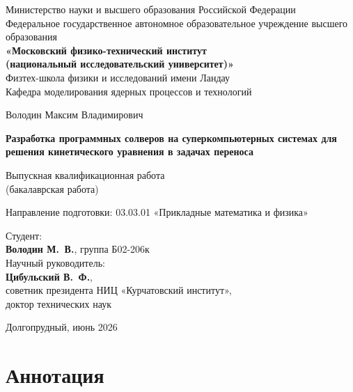\documentclass[14pt,a4paper]{extreport}
\numberwithin{equation}{chapter}
\numberwithin{figure}{chapter}
\numberwithin{table}{chapter}
\begin{document}
\begin{titlepage}
\thispagestyle{empty}
\centering
{\normalsize
Министерство науки и высшего образования Российской Федерации \\[2pt]
Федеральное государственное автономное образовательное учреждение высшего образования \\[2pt]
\textbf{«Московский физико-технический институт \\(национальный исследовательский университет)»} \\[6pt]
Физтех-школа физики и исследований имени Ландау \\
Кафедра моделирования ядерных процессов и технологий \\}

\vfill
{\large Володин Максим Владимирович\par}
\vspace{10mm}
{\Large\bfseries Разработка программных солверов на суперкомпьютерных системах для решения кинетического уравнения в
задачах переноса \par}
\vspace{6mm}
{\normalsize Выпускная квалификационная работа \\(бакалаврская работа) \par}
{\normalsize Направление подготовки: 03.03.01 «Прикладные математика и физика» \par}
\vfill

\raggedright
\hspace{60mm}\begin{minipage}{0.5\textwidth}
Студент:\\
\textbf{Володин М.\, В.}, группа Б02-206к\\[10pt]
Научный руководитель:\\
\textbf{Цибульский В.\, Ф.},\\
советник президента НИЦ «Курчатовский институт»,\\
доктор технических наук
\end{minipage}

\vfill
\centering
{\normalsize Долгопрудный, июнь 2026 \par}
\end{titlepage}



\chapter*{Аннотация}
\end{document}
